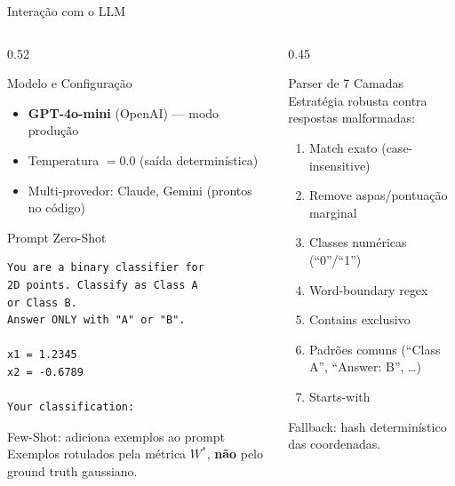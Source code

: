 \documentclass[aspectratio=169, 8pt]{beamer}
\begin{document}
\begin{frame}[fragile]{Interação com o LLM}
  \begin{columns}[T]
    \begin{column}{0.52\textwidth}
      \begin{block}{Modelo e Configuração}
        \begin{itemize}
          \item \textbf{GPT-4o-mini} (OpenAI) --- modo produção
          \item Temperatura $= 0.0$ (saída determinística)
          \item Multi-provedor: Claude, Gemini (prontos no código)
        \end{itemize}
      \end{block}

      \vspace{0.05em}

      \begin{block}{Prompt Zero-Shot}
        \begin{lstlisting}
You are a binary classifier for
2D points. Classify as Class A
or Class B.
Answer ONLY with "A" or "B".

x1 = 1.2345
x2 = -0.6789

Your classification:
        \end{lstlisting}
      \end{block}

      \vspace{0.05em}
      \begin{exampleblock}{Few-Shot: adiciona exemplos ao prompt}
        Exemplos rotulados pela métrica $W^*$,
        \textbf{não} pelo ground truth gaussiano.
      \end{exampleblock}
    \end{column}

    \begin{column}{0.45\textwidth}
      \begin{alertblock}{Parser de 7 Camadas}
        Estratégia robusta contra respostas malformadas:
        \begin{enumerate}
          \scriptsize
          \item Match exato (case-insensitive)
          \item Remove aspas/pontuação marginal
          \item Classes numéricas (``0''/``1'')
          \item Word-boundary regex
          \item Contains exclusivo
          \item Padrões comuns (``Class A'', ``Answer: B'', \ldots)
          \item Starts-with
        \end{enumerate}
        Fallback: hash determinístico das coordenadas.
      \end{alertblock}


\end{column}
\end{columns}
\end{frame}
\end{document}
